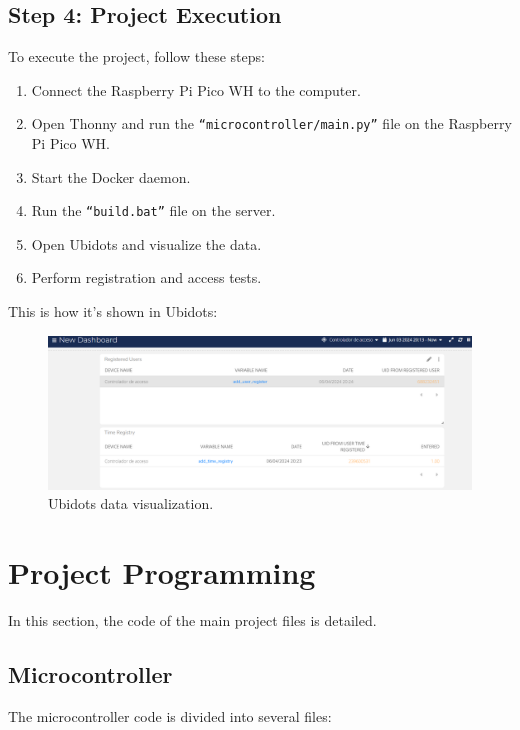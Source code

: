 \documentclass{article}
\begin{document}
\subsection{Step 4: Project Execution}
To execute the project, follow these steps:
\begin{enumerate}
	\item Connect the Raspberry Pi Pico WH to the computer.
	\item Open Thonny and run the \texttt{``microcontroller/main.py''} file on the Raspberry Pi Pico WH.
	\item Start the Docker daemon.
	\item Run the \texttt{``build.bat''} file on the server.
	\item Open Ubidots and visualize the data.
	\item Perform registration and access tests.
\end{enumerate}
This is how it's shown in Ubidots:
\begin{figure}[H]
    \centering
    \includegraphics[width=1\linewidth]{../images/ubidots_visualizacion.png}
    \caption{\label{fig:ubidots_visualizacion}Ubidots data visualization.}
\end{figure}

\section{Project Programming}
In this section, the code of the main project files is detailed.

\subsection{Microcontroller}
The microcontroller code is divided into several files:
\end{document}

